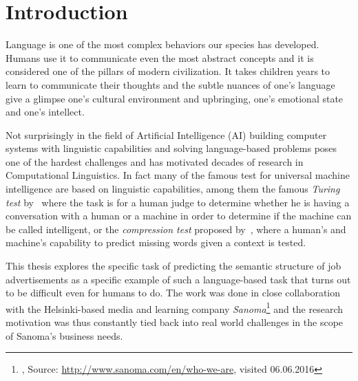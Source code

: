 
\thispagestyle{empty}


\section{Introduction}

Language is one of the most complex behaviors our species has developed. Humans use it to communicate even the most abstract concepts and it is considered one of the pillars of modern civilization. It takes children years to learn to communicate their thoughts and the subtle nuances of one's language give a glimpse one's cultural environment and upbringing, one's emotional state and one's intellect.

Not surprisingly in the field of Artificial Intelligence (AI) building computer systems with linguistic capabilities and solving language-based problems poses one of the hardest challenges and has motivated decades of research in Computational Linguistics. In fact many of the famous test for universal machine intelligence are based on linguistic capabilities, among them the famous \emph{Turing test} by~\cite{Turing:1950aa} where the task is for a human judge to determine whether he is having a conversation with a human or a machine in order to determine if the machine can be called intelligent, or the \emph{compression test} proposed by~\cite{Mahoney:1999aa}, where a human's and machine's capability to predict missing words given a context is tested.

This thesis explores the specific task of predicting the semantic structure of job advertisements as a specific example of such a language-based task that turns out to be difficult even for humans to do.
The work was done in close collaboration with the Helsinki-based media and learning company \emph{Sanoma}\footnote{, Source: \url{http://www.sanoma.com/en/who-we-are}, visited 06.06.2016} and the research motivation was thus constantly tied back into real world challenges in the scope of Sanoma's business needs.


